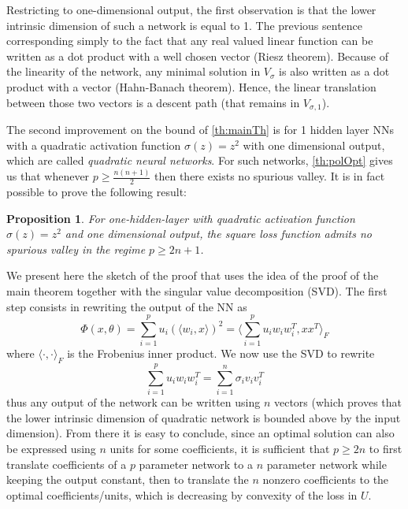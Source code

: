 \documentclass[11pt]{article} %
\newtheorem{proposition}{Proposition}[section]
\begin{document}
\par
Restricting to one-dimensional output, the first observation is that the lower intrinsic dimension of such a network is equal to 1. The previous sentence corresponding simply to the fact that any real valued linear function can be written as a dot product with a well chosen vector (Riesz theorem).
Because of the linearity of the network, any minimal solution in $V_\sigma$ is also written as a dot product with a vector (Hahn-Banach theorem). Hence, the linear translation between those two vectors is a descent path (that remains in $V_{\sigma, 1}$).
\par
The second improvement on the bound of \ref{th:mainTh} is for 1 hidden layer NNs with a quadratic activation function $\sigma(z) = z^2$ with one dimensional output, which are called \emph{quadratic neural networks}. For such networks, \ref{th:polOpt} gives us that whenever $p\geq \frac{n(n+1)}{2}$ then there exists no spurious valley. It is in fact possible to prove the following result:
\begin{proposition}\label{th:quadN}
	For one-hidden-layer with quadratic activation function $\sigma(z) = z^2$ and one dimensional output, the square loss function admits no spurious valley in the regime $p\geq 2n+1$.
\end{proposition}
We present here the sketch of the proof that uses the idea of the proof of the main theorem together with the singular value decomposition (SVD).
The first step consists in rewriting the output of the NN as
\begin{equation}
	\Phi(x,\theta) = \sum_{i=1}^p u_i(\langle w_i, x \rangle)^2 = \langle \sum_{i=1}^p u_i w_i w_i^T, xx^T\rangle_F
\end{equation}
where $\langle \cdot, \cdot\rangle_F$ is the Frobenius inner product.
We now use the SVD to rewrite
\begin{equation}
	\sum_{i=1}^p u_i w_i w_i^T = \sum_{i=1}^n \sigma_i v_i v_i^T 
\end{equation}
thus any output of the network can be written using $n$ vectors (which proves that the lower intrinsic dimension of quadratic network is bounded above by the input dimension). From there it is easy to conclude, since an optimal solution can also be expressed using $n$ units for some coefficients, it is sufficient that $p\geq 2n$ to first translate coefficients of a $p$ parameter network to a $n$ parameter network while keeping the output constant, then to translate the $n$ nonzero coefficients to the optimal coefficients/units, which is decreasing by convexity of the loss in $U$.
\end{document}
